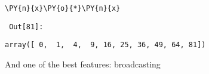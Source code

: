 {\par%
\vspace{-1\baselineskip}%
}%
\begin{notebookcell}[81]%
\begin{addmargin}[\cellleftmargin]{0em}%
{\smaller%
\par%
%
\vspace{-1\smallerfontscale}%
\begin{Verbatim}[commandchars=\\\{\}]
\PY{n}{x}\PY{o}{*}\PY{n}{x}
\end{Verbatim}
%
\par%
\vspace{-1\smallerfontscale}}%
\end{addmargin}
\end{notebookcell}

\par\vspace{1\smallerfontscale}%
    
        {\par%
        \vspace{-1\smallerfontscale}%
        \noindent%
        \begin{minipage}{\cellleftmargin}%
    \hfill%
    {\smaller%
    \tt%
    \color{nbframe-out-prompt}%
    Out[81]:}%
    \hspace{\inputpadding}%
    \hspace{0em}%
    \hspace{3pt}%
    \end{minipage}%
        }%
    \begin{addmargin}[\cellleftmargin]{0em}%
    {\smaller%
    \vspace{-1\smallerfontscale}%
    
    
    
    \begin{verbatim}
array([ 0,  1,  4,  9, 16, 25, 36, 49, 64, 81])
    \end{verbatim}

    
}%
    \end{addmargin}%
    And one of the best features: broadcasting


